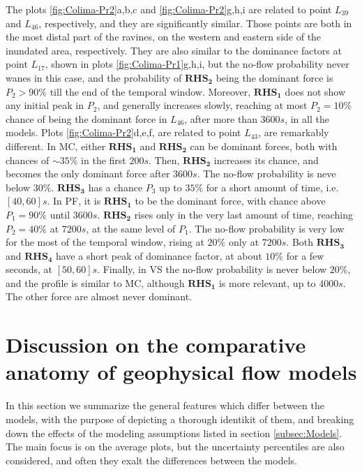 \documentclass{article}
\begin{document}
The plots \ref{fig:Colima-Pr2}a,b,c and \ref{fig:Colima-Pr2}g,h,i are related to point $L_{39}$ and $L_{46}$, respectively, and they are significantly similar. Those points are both in the most distal part of the ravines, on the western and eastern side of the inundated area, respectively. They are also similar to the dominance factors at point $L_{17}$, shown in plots \ref{fig:Colima-Pr1}g,h,i, but the no-flow probability never wanes in this case, and the probability of $\boldsymbol{RHS_2}$ being the dominant force is $P_2>90\%$ till the end of the temporal window. Moreover, $\boldsymbol{RHS_1}$ does not show any initial peak in $P_2$, and generally increases slowly, reaching at most $P_2=10\%$ chance of being the dominant force in $L_{46}$, after more than $3600 s$, in all the models. Plots \ref{fig:Colima-Pr2}d,e,f, are related to point $L_{43}$, are remarkably different. In MC, either $\boldsymbol{RHS_1}$ and $\boldsymbol{RHS_2}$ can be dominant forces, both with chances of $\sim 35\%$ in the first $200 s$. Then, $\boldsymbol{RHS_2}$ increases its chance, and becomes the only dominant force after $3600 s$. The no-flow probability is neve below $30\%$. $\boldsymbol{RHS_3}$ has a chance $P_3$ up to $35\%$ for a short amount of time, i.e. $[40, 60] s$. In PF, it is $\boldsymbol{RHS_1}$ to be the dominant force, with chance above $P_1=90\%$ until $3600 s$. $\boldsymbol{RHS_2}$ rises only in the very last amount of time, reaching $P_2=40\%$ at $7200 s$, at the same level of $P_1$. The no-flow probability is very low for the most of the temporal window, rising at $20\%$ only at $7200 s$. Both $\boldsymbol{RHS_3}$ and $\boldsymbol{RHS_4}$ have a short peak of dominance factor, at about $10\%$ for a few seconds, at $[50,60] s$. Finally, in VS the no-flow probability is never below $20\%$, and the profile is similar to MC, although $\boldsymbol{RHS_1}$ is more relevant, up to $4000 s$. The other force are almost never dominant.


\section{Discussion on the comparative anatomy of geophysical flow models}
In this section we summarize the general features which differ between the models, with the purpose of depicting a thorough identikit of them, and breaking down the effects of the modeling assumptions listed in section \ref{subsec:Models}. The main focus is on the average plots, but the uncertainty percentiles are also considered, and often they exalt the differences between the models. 
\end{document}
